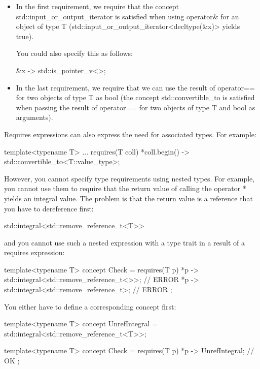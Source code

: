 \begin{itemize}
\item
In the first requirement, we require that the concept std::input\_or\_output\_iterator is satisfied when using operator\& for an object of type T (std::input\_or\_output\_iterator<decltype(\&x)> yields true).

You could also specify this as follows:

\begin{cpp}
{ &x } -> std::is_pointer_v<>;
\end{cpp}

\item
In the last requirement, we require that we can use the result of operator== for two objects of type T as bool (the concept std::convertible\_to is satisfied when passing the result of operator== for two objects of type T and bool as arguments).
\end{itemize}

Requires expressions can also express the need for associated types. For example:

\begin{cpp}
template<typename T>
... requires(T coll) {
	{ *coll.begin() } -> std::convertible_to<T::value_type>;
}
\end{cpp}

However, you cannot specify type requirements using nested types. For example, you cannot use them to require that the return value of calling the operator * yields an integral value. The problem is that the return value is a reference that you have to dereference first:

\begin{cpp}
std::integral<std::remove_reference_t<T>>
\end{cpp}

and you cannot use such a nested expression with a type trait in a result of a requires expression:

\begin{cpp}
template<typename T>
concept Check = requires(T p) {
	{ *p } -> std::integral<std::remove_reference_t<>>; // ERROR
	{ *p } -> std::integral<std::remove_reference_t>; // ERROR
};
\end{cpp}

You either have to define a corresponding concept first:

\begin{cpp}
template<typename T>
concept UnrefIntegral = std::integral<std::remove_reference_t<T>>;

template<typename T>
concept Check = requires(T p) {
	{ *p } -> UnrefIntegral; // OK
};
\end{cpp}

